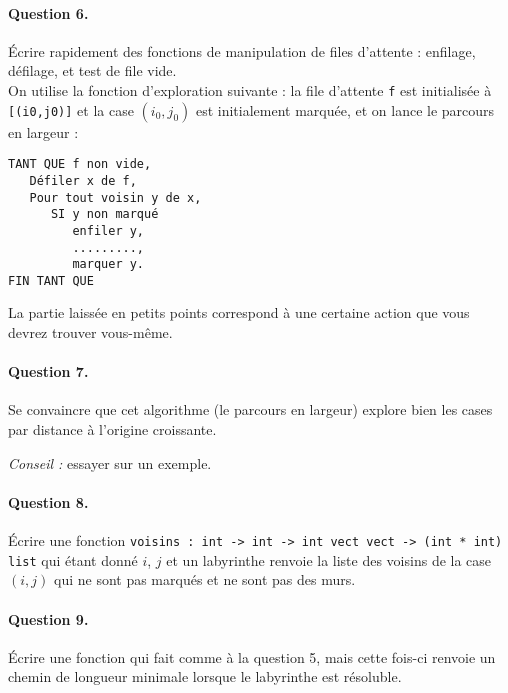 \documentclass[10pt,a4paper]{article}
\begin{document}
\paragraph{Question 6.} Écrire rapidement des fonctions de manipulation de files
d'attente : enfilage, défilage, et test de file vide.
\\

On utilise la fonction d'exploration suivante : la file d'attente \texttt{f} est
initialisée à \texttt{[(i0,j0)]} et la case $(i_0, j_0)$ est initialement
marquée, et on lance le parcours en largeur :
\begin{verbatim}TANT QUE f non vide,
   Défiler x de f,
   Pour tout voisin y de x,
      SI y non marqué
         enfiler y,
         .........,
         marquer y.
FIN TANT QUE     
\end{verbatim}
La partie laissée en petits points correspond à une certaine action que vous
devrez trouver vous-même.

\paragraph{Question 7.} Se convaincre que cet algorithme (le parcours en largeur)
explore bien les cases par distance à l'origine croissante. 

\textit{Conseil :} essayer sur un exemple.

\paragraph{Question 8.} Écrire une fonction \texttt{voisins : int -> int -> int vect vect -> (int * int) list} qui étant donné $i$, $j$ et un labyrinthe renvoie la liste 
des voisins de la case $(i,j)$ qui ne sont pas marqués et ne sont pas des murs.

\paragraph{Question 9.} Écrire une fonction qui fait comme à la question 5, mais
cette fois-ci renvoie un chemin de longueur minimale lorsque le labyrinthe est
résoluble.
\end{document}
